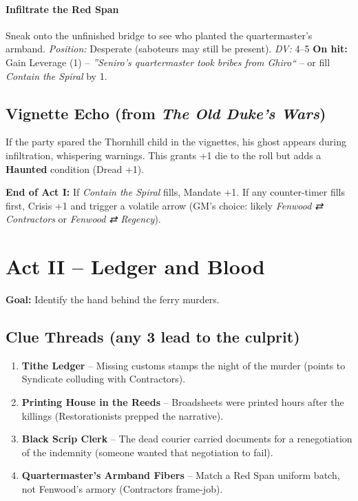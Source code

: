 \documentclass[11pt]{article}
\newcommand{\position}[1]{\textit{Position:} #1}
\newcommand{\dv}[1]{\textit{DV:} #1}
\begin{document}
\paragraph{Infiltrate the Red Span}
Sneak onto the unfinished bridge to see who planted the quartermaster's armband.  
\position{Desperate (saboteurs may still be present).} \dv{4--5}  
\textbf{On hit:} Gain Leverage (1) -- \textit{''Seniro's quartermaster took bribes from Ghiro``} -- or fill \textit{Contain the Spiral} by 1.

\subsection*{Vignette Echo (from \textit{The Old Duke's Wars})}
If the party spared the Thornhill child in the vignettes, his ghost appears during infiltration, whispering warnings. This grants +1 die to the roll but adds a \textbf{Haunted} condition (Dread +1).

\textbf{End of Act I:} If \textit{Contain the Spiral} fills, Mandate +1. If any counter-timer fills first, Crisis +1 and trigger a volatile arrow (GM's choice: likely \textit{Fenwood ⇄ Contractors} or \textit{Fenwood ⇄ Regency}).

\section*{Act II -- Ledger and Blood}
\textbf{Goal:} Identify the hand behind the ferry murders.

\subsection*{Clue Threads (any 3 lead to the culprit)}
\begin{enumerate}
  \item \textbf{Tithe Ledger} -- Missing customs stamps the night of the murder (points to Syndicate colluding with Contractors).
  \item \textbf{Printing House in the Reeds} -- Broadsheets were printed hours after the killings (Restorationists prepped the narrative).
  \item \textbf{Black Scrip Clerk} -- The dead courier carried documents for a renegotiation of the indemnity (someone wanted that negotiation to fail).
  \item \textbf{Quartermaster's Armband Fibers} -- Match a Red Span uniform batch, not Fenwood's armory (Contractors frame-job).
\end{enumerate}
\end{document}
